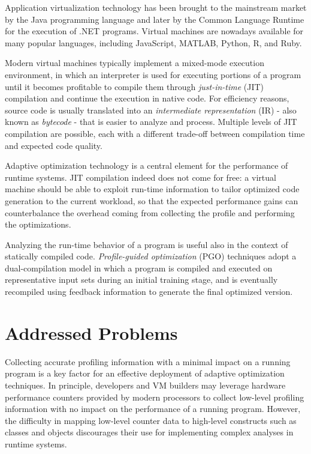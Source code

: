 Application virtualization technology has been brought to the mainstream market by the Java programming language and later by the Common Language Runtime for the execution of .NET programs. Virtual machines are nowadays available for many popular languages, including JavaScript, MATLAB, Python, R, and Ruby.

Modern virtual machines typically implement a mixed-mode execution environment, in which an interpreter is used for executing portions of a program until it becomes profitable to compile them through {\em just-in-time} (JIT) compilation and continue the execution in native code. For efficiency reasons, source code is usually translated into an {\em intermediate representation} (IR) - also known as {\em bytecode} - that is easier to analyze and process. Multiple levels of JIT compilation are possible, each with a different trade-off between compilation time and expected code quality.

Adaptive optimization technology is a central element for the performance of runtime systems. JIT compilation indeed does not come for free: a virtual machine should be able to exploit run-time information to tailor optimized code generation to the current workload, so that the expected performance gains can counterbalance the overhead coming from collecting the profile and performing the optimizations.

Analyzing the run-time behavior of a program is useful also in the context of statically compiled code. {\em Profile-guided optimization} (PGO) techniques adopt a dual-compilation model in which a program is compiled and executed on representative input sets during an initial training stage, and is eventually recompiled using feedback information to generate the final optimized version.

\section{Addressed Problems}

Collecting accurate profiling information with a minimal impact on a running program is a key factor for an effective deployment of adaptive optimization techniques. In principle, developers and VM builders may leverage hardware performance counters provided by modern processors to collect low-level profiling information with no impact on the performance of a running program. However, the difficulty in mapping low-level counter data to high-level constructs such as classes and objects discourages their use for implementing complex analyses in runtime systems.


